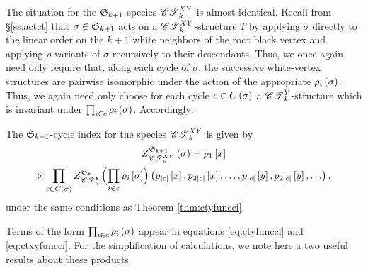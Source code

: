 \documentclass[distribution,draft]{brandiss} %
\numberwithin{section}{chapter}
\numberwithin{figure}{chapter}
\begin{document}
The situation for the $ \mathfrak{S}_{k+1} $-species $\mathscr{CT}_{k}^{XY}$ is almost identical.
Recall from \S \ref{ss:actct} that $\sigma \in  \mathfrak{S}_{k+1} $ acts on a $\mathscr{CT}_{k}^{XY}$-structure $T$ by applying $\sigma$ directly to the linear order on the $k+1$ white neighbors of the root black vertex and applying $\rho$-variants of $\sigma$ recursively to their descendants.
Thus, we once again need only require that, along each cycle of $\sigma$, the successive white-vertex structures are pairwise isomorphic under the action of the appropriate $\rho_{i} \left( {\sigma} \right)$.
Thus, we again need only choose for each cycle $c \in C \left( {\sigma} \right)$ a $\mathscr{CT}_{k}^{Y}$-structure which is invariant under $\prod_{i \in c} \rho_{i} \left( {\sigma} \right)$.
Accordingly:
\begin{theorem}
  \label{thm:ctxyfuncci}
  The $ \mathfrak{S}_{k+1} $-cycle index for the species $\mathscr{CT}_{k}^{XY}$ is given by
  \begin{multline}
    \label{eq:ctxyfuncci}
    \gcielt{\symgp{k+1}}{\ctxy{k}}{\sigma} = p_{1} \sbrac{x} \\
    \times \prod_{c \in C \pbrac{\sigma}} \gci{\symgp{k}}{\cty{k}} \pbracs[Big]{\prod_{i \in c} \rho_{i} \sbrac{\sigma}} \pbrac{p_{\abs{c}} \sbrac{x}, p_{2 \abs{c}} \sbrac{x}, \dots, p_{\abs{c}} \sbrac{y}, p_{2 \abs{c}} \sbrac{y}, \dots}.
  \end{multline}
  under the same conditions as Theorem \ref{thm:ctyfuncci}.
\end{theorem}

Terms of the form $\prod_{i \in c} \rho_{i} \left( {\sigma} \right)$ appear in equations \eqref{eq:ctyfuncci} and \eqref{eq:ctxyfuncci}.
For the simplification of calculations, we note here a two useful results about these products.
\end{document}
